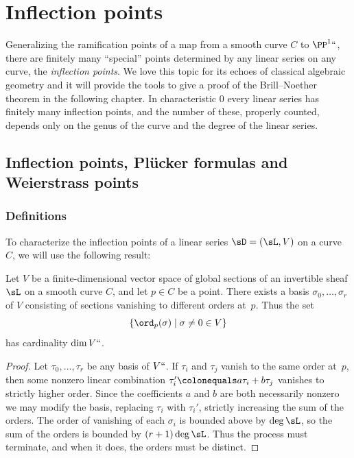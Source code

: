
\chapter{Inflection points}\label{inflections chapter}
\label{InflectionsChapter}

Generalizing the ramification points of a map from a smooth curve $C$
%
to $\PP^1` `$, there are finitely many ``special'' points determined by
any linear series on any curve, the \emph{inflection points}.
%
We love this topic for its echoes of classical algebraic geometry and
it will provide the tools to give a proof of the Brill--Noether
theorem in the following chapter. In characteristic 0 every linear
series has finitely many inflection points, and the number of these,
properly counted, depends only on the genus of the curve and the
degree of the linear series.

\section{Inflection points,  Pl\"ucker formulas and Weierstrass points}

\subsection*{Definitions}
To characterize the inflection points of a linear series
$\sD = (\sL, V)$ on a curve $C$, we will use the following result:

\begin{proposition}\label{vanishing sequence} Let $V$ be a
%
  finite-dimensional vector space of
global sections
%
of an
invertible sheaf
%
$\sL$ on a smooth curve $C$, and let $p \in C$
be a point. There exists a basis $\sigma_0, \dots, \sigma_r$ of $V$
consisting of sections vanishing to different orders at~$p$. Thus the set
$$
\{ \ord_p(\sigma) \mid \sigma \neq 0 \in V \}
$$
 has cardinality $\dim V` `$.
\unif
\end{proposition}

\begin{proof}
Let $\tau_0, \dots, \tau_r$ be any basis of $V` `$.  If  $\tau_i$ and
$\tau_j$ vanish to the same order at~$p$, then
some nonzero linear combination $\tau_i' \colonequals  a\tau_i+b\tau_j$
vanishes to strictly higher order. Since the coefficients $a$ and $b$
are both necessarily nonzero we may modify the basis, replacing $\tau_i$
with $\tau_i'$, strictly increasing the sum of the orders.
The order of vanishing of each $\sigma_i$ is bounded above by $\deg \sL$,
so the sum of the orders is bounded by $(r+1)\deg \sL$. Thus the process
must terminate, and when it does,
 the orders must be distinct.
\end{proof}

